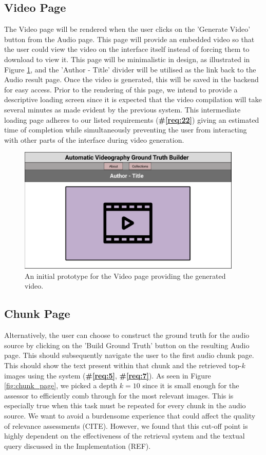 \documentclass{l4proj}
\begin{document}
\subsection{Video Page}
The Video page will be rendered when the user clicks on the 'Generate Video' button from the Audio page. This page will provide an embedded video so that the user could view the video on the interface itself instead of forcing them to download to view it. This page will be minimalistic in design, as illustrated in Figure \ref{fig:video_page}, and the 'Author - Title' divider will be utilised as the link back to the Audio result page. Once the video is generated, this will be saved in the backend for easy access. Prior to the rendering of this page, we intend to provide a descriptive loading screen since it is expected that the video compilation will take several minutes as made evident by the previous system. This intermediate loading page adheres to our listed requirements (\textbf{\#\ref{req:22}}) giving an estimated time of completion while simultaneously preventing the user from interacting with other parts of the interface during video generation.

\begin{figure}
    \centering
    \includegraphics[width=0.95\textwidth]{figures/video_page.pdf}
    \caption{An initial prototype for the Video page providing the generated video.}
    \label{fig:video_page}
\end{figure}

\subsection{Chunk Page}
Alternatively, the user can choose to construct the ground truth for the audio source by clicking on the 'Build Ground Truth' button on the resulting Audio page. This should subsequently navigate the user to the first audio chunk page. This should show the text present within that chunk and the retrieved top-$k$ images using the system (\textbf{\#\ref{req:5}}, \textbf{\#\ref{req:7}}). As seen in Figure \ref{fig:chunk_page}, we picked a depth $k=10$ since it is small enough for the assessor to efficiently comb through for the most relevant images. This is especially true when this task must be repeated for every chunk in the audio source. We want to avoid a burdensome experience that could affect the quality of relevance assessments (CITE). However, we found that this cut-off point is highly dependent on the effectiveness of the retrieval system and the textual query discussed in the Implementation (REF).
\end{document}

